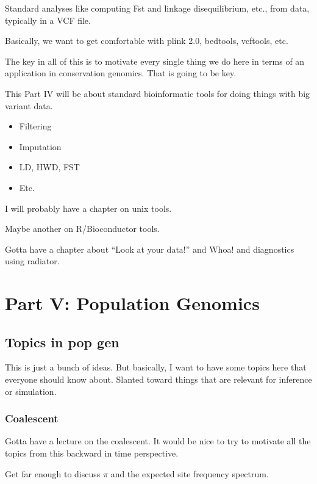\documentclass[]{krantz}
\providecommand{\tightlist}{%
  \setlength{\itemsep}{0pt}\setlength{\parskip}{0pt}}
\begin{document}
Standard analyses like computing Fst and linkage disequilibrium, etc., from
data, typically in a VCF file.

Basically, we want to get comfortable with plink 2.0, bedtools, vcftools, etc.

The key in all of this is to motivate every single thing we do here in terms of an
application in conservation genomics. That is going to be key.

This Part IV will be about standard bioinformatic tools for doing things
with big variant data.

\begin{itemize}
\tightlist
\item
  Filtering
\item
  Imputation
\item
  LD, HWD, FST
\item
  Etc.
\end{itemize}

I will probably have a chapter on unix tools.

Maybe another on R/Bioconductor tools.

Gotta have a chapter about ``Look at your data!'' and Whoa! and diagnostics
using radiator.

\hypertarget{part-part-v-population-genomics}{%
\part{Part V: Population Genomics}\label{part-part-v-population-genomics}}

\hypertarget{topics-in-pop-gen}{%
\chapter{Topics in pop gen}\label{topics-in-pop-gen}}

This is just a bunch of ideas. But basically, I want to have some topics here that
everyone should know about. Slanted toward things that are relevant for inference
or simulation.

\hypertarget{coalescent}{%
\section{Coalescent}\label{coalescent}}

Gotta have a lecture on the coalescent. It would be nice to try to motivate
all the topics from this backward in time perspective.

Get far enough to discuss \(\pi\) and the expected site frequency spectrum.
\end{document}
